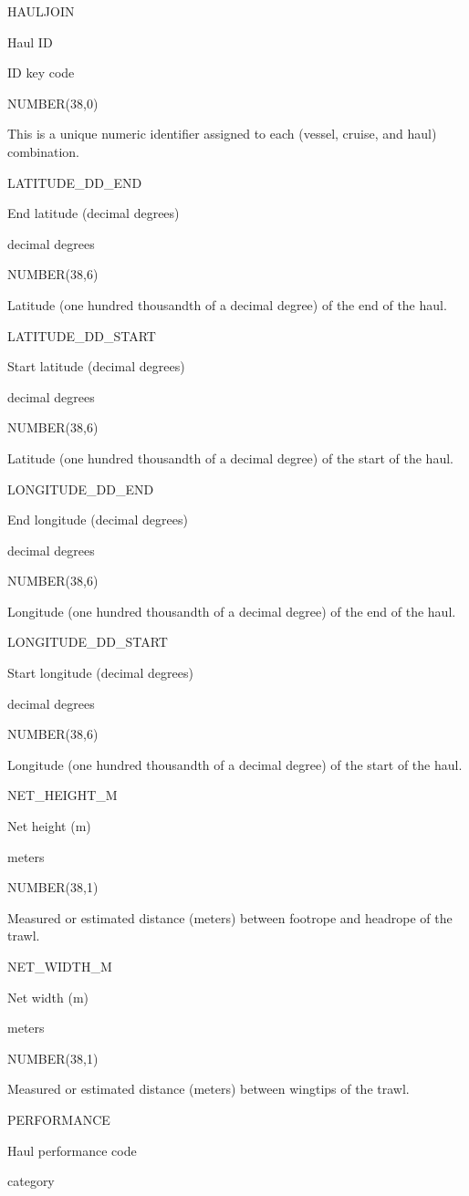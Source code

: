 \documentclass[
  letterpaper,
  oneside,
  open=any]{scrbook}
\begin{document}
HAULJOIN

Haul ID

ID key code

NUMBER(38,0)

This is a unique numeric identifier assigned to each (vessel, cruise,
and haul) combination.

LATITUDE\_DD\_END

End latitude (decimal degrees)

decimal degrees

NUMBER(38,6)

Latitude (one hundred thousandth of a decimal degree) of the end of the
haul.

LATITUDE\_DD\_START

Start latitude (decimal degrees)

decimal degrees

NUMBER(38,6)

Latitude (one hundred thousandth of a decimal degree) of the start of
the haul.

LONGITUDE\_DD\_END

End longitude (decimal degrees)

decimal degrees

NUMBER(38,6)

Longitude (one hundred thousandth of a decimal degree) of the end of the
haul.

LONGITUDE\_DD\_START

Start longitude (decimal degrees)

decimal degrees

NUMBER(38,6)

Longitude (one hundred thousandth of a decimal degree) of the start of
the haul.

NET\_HEIGHT\_M

Net height (m)

meters

NUMBER(38,1)

Measured or estimated distance (meters) between footrope and headrope of
the trawl.

NET\_WIDTH\_M

Net width (m)

meters

NUMBER(38,1)

Measured or estimated distance (meters) between wingtips of the trawl.

PERFORMANCE

Haul performance code

category
\end{document}
